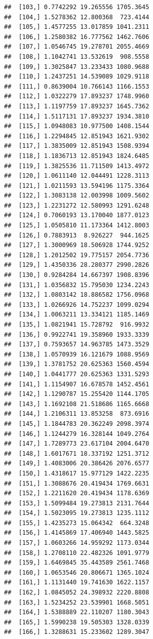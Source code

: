 \documentclass[article]{jss}\usepackage[]{graphicx}\usepackage[]{xcolor}
\makeatletter
\newenvironment{kframe}{%
 \def\at@end@of@kframe{}%
 \ifinner\ifhmode%
  \def\at@end@of@kframe{\end{minipage}}%
  \begin{minipage}{\columnwidth}%
 \fi\fi%
 \def\FrameCommand##1{\hskip\@totalleftmargin \hskip-\fboxsep
 \colorbox{shadecolor}{##1}\hskip-\fboxsep
     \hskip-\linewidth \hskip-\@totalleftmargin \hskip\columnwidth}%
 \MakeFramed {\advance\hsize-\width
   \@totalleftmargin\z@ \linewidth\hsize
   \@setminipage}}%
 {\par\unskip\endMakeFramed%
 \at@end@of@kframe}
\newenvironment{knitrout}{}{} %
\makeatother
\begin{document}
\begin{knitrout}
\begin{kframe}
\begin{verbatim}
##  [103,] 0.7742292 19.265556 1705.3645
##  [104,] 1.5278362 12.800368  723.4144
##  [105,] 1.4577255 13.017859 1041.2311
##  [106,] 1.2580382 16.777562 1462.7606
##  [107,] 1.0546745 19.278701 2055.4669
##  [108,] 1.1042741 13.532619  908.5558
##  [109,] 1.3025847 13.233433 1080.9688
##  [110,] 1.2437251 14.539089 1029.9118
##  [111,] 0.8639004 10.766143 1166.1553
##  [112,] 1.0322279 17.893237 1748.9960
##  [113,] 1.1197759 17.893237 1645.7362
##  [114,] 1.5117131 17.893237 1934.3810
##  [115,] 1.0948083 10.977500 1408.1544
##  [116,] 1.2294845 12.851943 1621.9302
##  [117,] 1.3835009 12.851943 1508.9394
##  [118,] 1.1836713 12.851943 1824.6485
##  [119,] 1.3825536 11.711509 1413.4972
##  [120,] 1.0611140 12.044491 1228.3113
##  [121,] 1.0211593 13.594196 1175.3364
##  [122,] 1.3083138 12.003998 1009.5602
##  [123,] 1.2231272 12.580993 1291.6248
##  [124,] 0.7060193 13.170040 1877.0123
##  [125,] 1.0505810 11.173364 1412.8003
##  [126,] 0.7883913  8.926227  944.1625
##  [127,] 1.3000969 18.506928 1744.9252
##  [128,] 1.2012502 19.775157 2054.7736
##  [129,] 1.4350336 28.280377 2990.2826
##  [130,] 0.9284284 14.667397 1908.8396
##  [131,] 1.0356832 15.795030 1234.2243
##  [132,] 1.0803142 18.886582 1756.0968
##  [133,] 1.0266926 14.752237 1099.0294
##  [134,] 1.0063211 13.334121 1185.1469
##  [135,] 1.0821941 15.728792  916.9932
##  [136,] 0.9922741 19.358960 1933.3339
##  [137,] 0.7593657 14.963785 1473.3529
##  [138,] 1.0570939 16.121679 1088.9569
##  [139,] 1.3781752 20.625363 1560.4594
##  [140,] 1.0441777 20.625363 1331.5293
##  [141,] 1.1154907 16.678578 1452.4561
##  [142,] 1.1290787 15.255420 1144.1705
##  [143,] 1.1692108 21.518686 1165.6668
##  [144,] 1.2106311 13.853258  873.6916
##  [145,] 1.1844783 20.362249 2098.3974
##  [146,] 1.1244279 16.328144 1049.2764
##  [147,] 1.7289773 23.617104 2004.6470
##  [148,] 1.6017671 18.337192 1251.3712
##  [149,] 1.4083006 20.386426 2076.6577
##  [150,] 1.4318617 15.977129 1422.2235
##  [151,] 1.3088676 20.419434 1769.6631
##  [152,] 1.2211620 20.419434 1178.6369
##  [153,] 1.5099484 19.273813 2131.7644
##  [154,] 1.5023095 19.273813 1235.1112
##  [155,] 1.4235273 15.064342  664.3248
##  [156,] 1.4145869 17.406940 1443.5825
##  [157,] 1.0603266 14.959292 1173.0344
##  [158,] 1.2708110 22.482326 1091.9779
##  [159,] 1.6469845 35.443589 2561.7468
##  [160,] 1.0653546 20.806671 1365.1024
##  [161,] 1.1131440 19.741630 1622.1157
##  [162,] 1.0845052 24.398932 2220.8808
##  [163,] 1.5234252 23.539901 1668.5051
##  [164,] 1.5388889 22.110207 1180.3043
##  [165,] 1.5990238 19.505303 1328.0339
##  [166,] 1.3288631 15.233602 1289.3047

\end{verbatim}
\end{kframe}
\end{knitrout}
\end{document}
